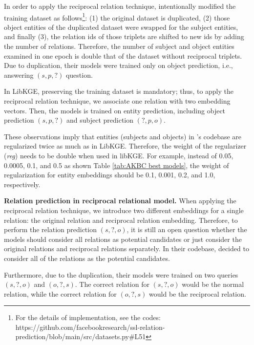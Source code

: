 In order to apply the reciprocal relation technique, \citet{chen2021relation} intentionally modified the training dataset as follows\footnote{For the details of implementation, see the codes: https://github.com/facebookresearch/ssl-relation-prediction/blob/main/src/datasets.py\#L51}: (1) the original dataset is duplicated, (2) those object entities of the duplicated dataset were swapped for the subject entities, and finally (3), the relation ids of those triplets are shifted to new ids by adding the number of relations. Therefore, the number of subject and object entities examined in one epoch is double that of the dataset without reciprocal triplets. Due to duplication, their models were trained only on object prediction, i.e., answering $(s,p,?)$ question.

In LibKGE, preserving the training dataset is mandatory; thus, to apply the reciprocal relation technique, we associate one relation with two embedding vectors. Then, the models is trained on entity prediction, including object prediction $(s,p,?)$ and subject prediction $(?,p,o)$. 


These observations imply that entities (subjects and objects) in \citet{chen2021relation}'s codebase are regularized twice as much as in LibKGE. Therefore, the weight of the regularizer (\textit{reg}) needs to be double when used in libKGE. For example, instead of 0.05, 0.0005, 0.1, and 0.5 as shown Table \ref{tab:AKBC best models}, the weight of regularization for entity embeddings should be 0.1, 0.001, 0.2, and 1.0, respectively.
\newline

\noindent\textbf{Relation prediction in reciprocal relational model.}
When applying the reciprocal relation technique, we introduce two different embeddings for a single relation: the original relation and reciprocal relation embedding. Therefore, to perform the relation prediction $(s,?,o)$, it is still an open question whether the models should consider all relations as potential candidates or just consider the original relations and reciprocal relations separately. In their codebase, \citet{chen2021relation} decided to consider all of the relations as the potential candidates. 

Furthermore, due to the duplication, their models were trained on two queries $(s,?,o)$ and $(o,?,s)$. The correct relation for $(s,?,o)$ would be the normal relation, while the correct relation for $(o,?,s)$ would be the reciprocal relation. 
\newline


